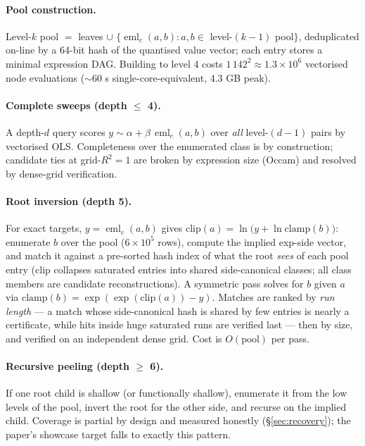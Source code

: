 \documentclass[11pt]{article}
\newcommand{\eml}{\operatorname{eml}}
\begin{document}
\paragraph{Pool construction.} Level-$k$ pool $=$ leaves $\cup$
$\{\eml_c(a,b): a,b \in$ level-$(k{-}1)$ pool$\}$, deduplicated
on-line by a 64-bit hash of the quantised value vector; each entry
stores a minimal expression DAG. Building to level 4 costs
$1\,142^2 \approx 1.3\times10^{6}$ vectorised node evaluations
(${\sim}60$ s single-core-equivalent, 4.3 GB peak).

\paragraph{Complete sweeps (depth $\le$ 4).} A depth-$d$ query scores
$y \sim \alpha + \beta\,\eml_c(a,b)$ over \emph{all} level-$(d{-}1)$
pairs by vectorised OLS. Completeness over the enumerated class is by
construction; candidate ties at grid-$R^2=1$ are broken by expression
size (Occam) and resolved by dense-grid verification.

\paragraph{Root inversion (depth 5).} For exact targets,
$y=\eml_c(a,b)$ gives $\mathrm{clip}(a) = \ln\!\bigl(y + \ln
\mathrm{clamp}(b)\bigr)$: enumerate $b$ over the pool ($6\times10^{5}$
rows), compute the implied exp-side vector, and match it against a
pre-sorted hash index of what the root \emph{sees} of each pool entry
($\mathrm{clip}$ collapses saturated entries into shared
side-canonical classes; all class members are candidate
reconstructions). A symmetric pass solves for $b$ given $a$ via
$\mathrm{clamp}(b) = \exp(\exp(\mathrm{clip}(a)) - y)$. Matches are
ranked by \emph{run length} — a match whose side-canonical hash is
shared by few entries is nearly a certificate, while hits inside huge
saturated runs are verified last — then by size, and verified on an
independent dense grid. Cost is $O(\text{pool})$ per pass.

\paragraph{Recursive peeling (depth $\ge$ 6).} If one root child is
shallow (or functionally shallow), enumerate it from the low levels of
the pool, invert the root for the other side, and recurse on the
implied child. Coverage is partial by design and measured honestly
(\S\ref{sec:recovery}); the paper's showcase target falls to exactly
this pattern.
\end{document}
